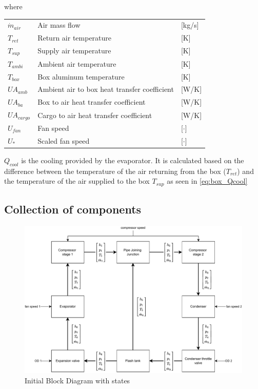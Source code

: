 where
\begin{center}
	\begin{tabular}{l p{8cm} l}
		$\dot{m}_{air}$ & Air mass flow                                & [\si{kg}/{\si{s}}] \\
		$T_{ret}$       & Return air temperature                       & [\si{K}]           \\
		$T_{sup}$       & Supply air temperature                       & [\si{K}]           \\
		$T_{ambi}$      & Ambient air temperature                      & [\si{K}]           \\
		$T_{box}$       & Box aluminum temperature                     & [\si{K}]           \\
		$U A_{amb}$     & Ambient air to box heat transfer coefficient & [\si{W}/\si{K}]    \\
		$U A_{ba}$      & Box to air heat transfer coefficient         & [\si{W}/\si{K}]    \\
		$U A_{cargo}$   & Cargo to air heat transfer coefficient       & [\si{W}/\si{K}]    \\
		$U_{fan}$       & Fan speed                                    & [$\cdot$]          \\
		$U_*$    & Scaled fan speed                             & [$\cdot$]
	\end{tabular}
\end{center}

$Q_{cool}$ is the cooling provided by the evaporator. It is calculated based on the difference between the temperature of the air returning from the box ($T_{ret}$) and the temperature of the air supplied to the box $T_{sup}$ as seen in \cref{eq:box_Qcool}

\clearpage
\newpage
\subsection{Collection of components}

\begin{figure}[h!]
	\centering
	\includegraphics[width=1\textwidth]{Graphics/Block_Diagram.pdf}
	\caption{Initial Block Diagram with states}
	\label{fig:Block_diagram}
\end{figure}



